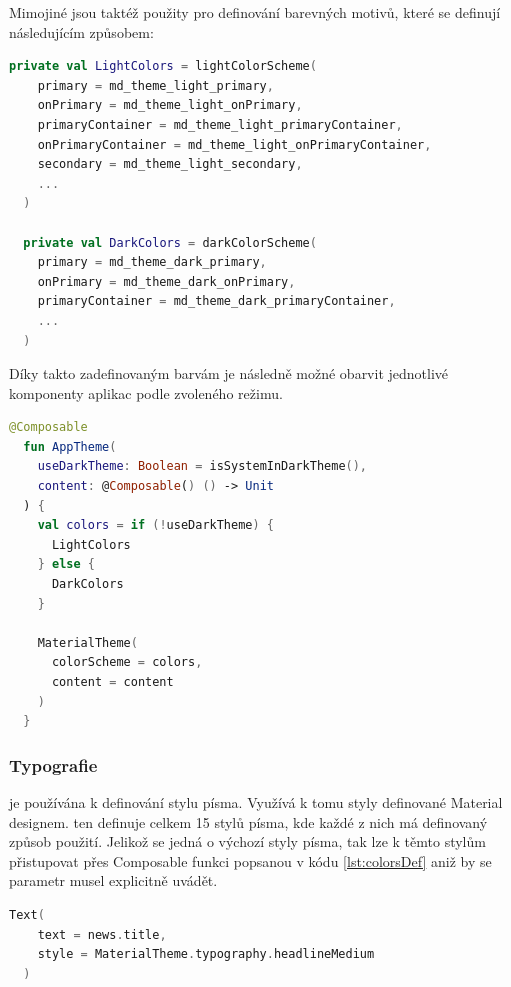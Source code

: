 Mimojiné jsou taktéž použity pro definování barevných motivů, které se definují následujícím způsobem:

\begin{lstlisting}[caption={Definice barevných motivů}, label={lst:ComposeCode}, language=Kotlin]
  private val LightColors = lightColorScheme(
    primary = md_theme_light_primary,
    onPrimary = md_theme_light_onPrimary,
    primaryContainer = md_theme_light_primaryContainer,
    onPrimaryContainer = md_theme_light_onPrimaryContainer,
    secondary = md_theme_light_secondary,
    ...
  )

  private val DarkColors = darkColorScheme(
    primary = md_theme_dark_primary,
    onPrimary = md_theme_dark_onPrimary,
    primaryContainer = md_theme_dark_primaryContainer,
    ...
  )
\end{lstlisting}

Díky takto zadefinovaným barvám je následně možné obarvit jednotlivé komponenty aplikac podle zvoleného režimu.

\begin{lstlisting}[caption={Definice barevných motivů}, label={lst:colorsDef}, language=Kotlin]
  @Composable
  fun AppTheme(
    useDarkTheme: Boolean = isSystemInDarkTheme(),
    content: @Composable() () -> Unit
  ) {
    val colors = if (!useDarkTheme) {
      LightColors
    } else {
      DarkColors
    }
  
    MaterialTheme(
      colorScheme = colors,
      content = content
    )
  }
\end{lstlisting}

\subsubsection{Typografie}
je používána k definování stylu písma. Využívá k tomu styly definované Material designem. ten definuje celkem 15 stylů písma,
kde každé z nich má definovaný způsob použití. \cite{material3} Jelikož se jedná o výchozí styly písma, tak lze k těmto stylům přistupovat přes
Composable funkci  popsanou v kódu \ref{lst:colorsDef} aniž by se parametr  musel explicitně
uvádět.

\begin{lstlisting}[caption={Ukázka použití stylu písma}, label={lst:typographyExample}, language=Kotlin]
  Text(
    text = news.title,
    style = MaterialTheme.typography.headlineMedium
  )
\end{lstlisting}


